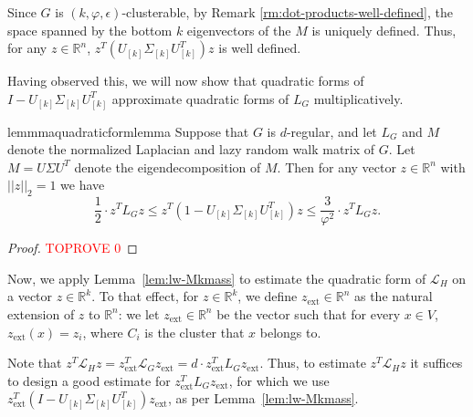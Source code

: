 \documentclass[letterpaper,11pt]{article}
\newcommand{\zext}{z_{\text{ext}}}
\newcommand{\R}{\mathbb{R}}
\theoremstyle{plain}
\theoremstyle{definition}
\theoremstyle{remark}
\newcommand{\e}{\epsilon}
\begin{document}
Since $G$ is $(k, \varphi, \e)$-clusterable, by Remark \ref{rm:dot-products-well-defined}, the space spanned by the bottom $k$ eigenvectors of the $M$ is uniquely defined. 
Thus, for any $z \in \R^n$,  $z^T (U_{[k]} \Sigma_{[k]} U_{[k]}^T) z$ is well defined. 

Having observed this, we will now show that quadratic forms of $I - U_{[k]}\Sigma_{[k]} U_{[k]}^T$ approximate quadratic forms of $L_G$ multiplicatively.
\begin{restatable}{lemmma}{quadraticformlemma}
\label{lem:lw-Mkmass}Suppose that $G$ is $d$-regular, and let $L_G$ and $M$ denote the normalized Laplacian and lazy random walk matrix of $G$. Let $M=U\Sigma U^T$ denote the eigendecomposition of $M$. Then for any vector $z\in \R^n$ with $||z||_2=1$ we have
\[ \frac{1}{2}  \cdot  z^T L_G z \leq z^T\left(1-  U_{[k]}\Sigma_{[k]}U_{[k]}^T \right)z \leq  \frac{3}{\varphi^2} \cdot  z^T L_G z.\]
\end{restatable}
\begin{proof}\textcolor{red}{TOPROVE 0}\end{proof}

Now, we apply Lemma~\ref{lem:lw-Mkmass} to estimate the quadratic form of $\mathcal{L}_H$ on a vector $z\in \R^k$. To that effect, for $z \in \R^k$, we define $\zext \in \R^n$ as the natural extension of $z$ to $\R^n$: we let $\zext\in \R^n$ be the vector such that for every $x\in V$,  $\zext(x) = z_i$, where $C_i$ is the cluster that $x$ belongs to.  



Note that $z^T \mathcal{L}_H z = \zext^T \mathcal{L}_G \zext = d\cdot \zext^T L_G \zext.$ 
Thus, to estimate $z^T \mathcal{L}_H z$ it suffices to design a good estimate for $\zext^T L_G \zext$, for which we use $\zext^T(I - U_{[k]}\Sigma_{[k]} U_{[k]}^T)\zext$, as per Lemma~\ref{lem:lw-Mkmass}. 
\end{document}
